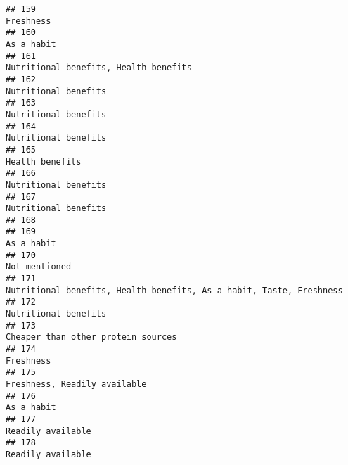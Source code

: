\documentclass[
]{article}
\begin{document}
\begin{verbatim}
## 159                                                                                                                  Freshness
## 160                                                                                                                 As a habit
## 161                                                                                      Nutritional benefits, Health benefits
## 162                                                                                                       Nutritional benefits
## 163                                                                                                       Nutritional benefits
## 164                                                                                                       Nutritional benefits
## 165                                                                                                            Health benefits
## 166                                                                                                       Nutritional benefits
## 167                                                                                                       Nutritional benefits
## 168                                                                                                                           
## 169                                                                                                                 As a habit
## 170                                                                                                              Not mentioned
## 171                                                        Nutritional benefits, Health benefits, As a habit, Taste, Freshness
## 172                                                                                                       Nutritional benefits
## 173                                                                                         Cheaper than other protein sources
## 174                                                                                                                  Freshness
## 175                                                                                               Freshness, Readily available
## 176                                                                                                                 As a habit
## 177                                                                                                          Readily available
## 178                                                                                                          Readily available

\end{verbatim}
\end{document}
